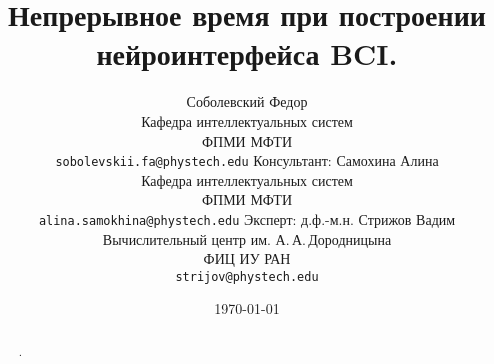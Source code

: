 \documentclass[a4paper, 12pt]{article} %
\title{Непрерывное время при построении нейроинтерфейса BCI.}
\author{ Соболевский Федор\\
	Кафедра интеллектуальных систем \\
        ФПМИ МФТИ\\ 
	\texttt{sobolevskii.fa@phystech.edu} 
	\AND
        Консультант: Самохина Алина\\
	Кафедра интеллектуальных систем \\
        ФПМИ МФТИ\\
	\texttt{alina.samokhina@phystech.edu} 
        \AND
        Эксперт: д.ф.-м.н. Стрижов Вадим\\
	Вычислительный центр им. А.\,А.\,Дородницына\\
        ФИЦ ИУ РАН \\
	\texttt{strijov@phystech.edu}
}
\date{\today}
\begin{document}
\maketitle

\begin{abstract}
.
\end{abstract}



 


\end{document}
